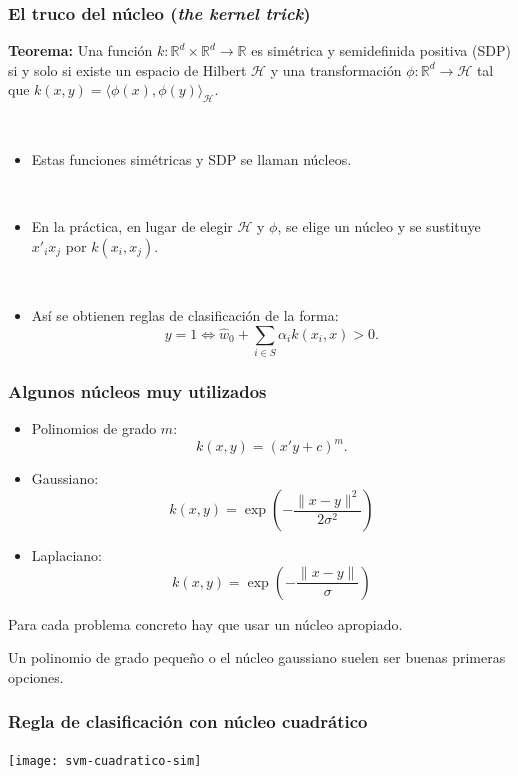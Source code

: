 \documentclass[dvipsnames, pdflatex,slidecentered]{beamer}
\begin{document}
\begin{frame}[plain]
\frametitle{El truco del núcleo (\textit{the kernel trick})}

\textbf{Teorema:} Una función $k:\mathbb{R}^d\times \mathbb{R}^d\to\mathbb{R}$ es simétrica y semidefinida positiva (SDP) si y solo si existe un espacio de Hilbert $\mathcal{H}$ y una transformación $\phi:\mathbb{R}^d\to \mathcal{H}$ tal que $k(x,y)=\langle \phi(x),\phi(y)\rangle_{\mathcal{H}}$.

\

\begin{itemize}
\item Estas funciones simétricas y SDP se llaman núcleos.

\

\item En la práctica, en lugar de elegir $\mathcal{H}$ y $\phi$, se elige un núcleo y se sustituye $x'_ix_j$ por $k(x_i,x_j)$.

\

\item Así se obtienen reglas de clasificación de la forma:
\[
y = 1 \Leftrightarrow  \hat w_0 + \sum_{i\in S} \alpha_i k(x_i,x) > 0.
\]
\end{itemize}

\end{frame}
\begin{frame}[plain]
\frametitle{Algunos núcleos muy utilizados}

\begin{itemize}
\item Polinomios de grado $m$:
\[
k(x,y) = (x'y + c)^m.
\]

\item Gaussiano:
\[
k(x,y) = \exp\left(-\frac{\|x-y\|^2}{2\sigma^2} \right)
\]


\item Laplaciano:
\[
k(x,y) = \exp\left(-\frac{\|x-y\|}{\sigma}\right)
\]
\end{itemize}

Para cada problema concreto hay que usar un núcleo apropiado.

 Un polinomio de grado pequeño o el núcleo gaussiano suelen ser buenas primeras opciones.

\end{frame}
\begin{frame}[plain]
\frametitle{Regla de clasificación con núcleo cuadrático}



\begin{center}
\texttt{[image: svm-cuadratico-sim]}
\end{center}



\end{frame}
\end{document}
